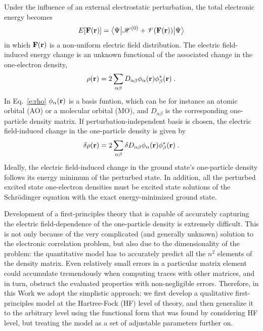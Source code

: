 \documentclass[aip,graphicx]{revtex4-1}
\newcommand{\tbraket}[3]{\ensuremath{\bigl\langle {#1} \bigl\lvert {#2} \bigl\lvert {#3} \bigr\rangle}}
\begin{document}
Under the influence of an external electrostatic perturbation, the total electronic energy
becomes
%
\begin{equation}
 E[{\bf F}({\bf r})] = \tbraket{\Psi}{\mathscr{H}^{(0)} + \mathscr{V}({\bf F}({\bf r}))}{\Psi}
\end{equation}
%
in which ${\bf F}({\bf r})$ is a non\hyp{}uniform electric field distribution.
The electric field\hyp{}induced energy change is an unknown functional 
of the associated change in the one\hyp{}electron density,
%
\begin{equation}\label{e:rho}
 \rho({\bf r}) = 2\sum_{\alpha\beta} D_{\alpha\beta} \phi_\alpha({\bf r}) \phi^*_\beta({\bf r}) \;.
\end{equation}
%
In Eq.~\eqref{e:rho} $\phi_\alpha({\bf r})$ is a basis funtion, which can be for instance 
an atomic orbital (AO) or a molecular orbital (MO), and $D_{\alpha\beta}$ is the corresponding
one\hyp{}particle density matrix.
If perturbation\hyp{}independent basis is chosen, the electric field\hyp{}induced change in the one\hyp{}particle density
is given by
%
\begin{equation}\label{e:rho}
 \delta \rho({\bf r}) = 2\sum_{\alpha\beta} \delta D_{\alpha\beta} \phi_\alpha({\bf r}) \phi^*_\beta({\bf r}) \;.
\end{equation}
%
Ideally, the electric field\hyp{}induced change in the ground state's one\hyp{}particle density 
follows its energy minimum of the perturbed state. In addition, all the perturbed 
excited state one\hyp{}electron densities must be excited state solutions of the Schr{\"o}dinger equation
with the exact energy\hyp{}minimized ground state. 

Development of a first\hyp{}principles theory
that is capable of accurately capturing the electric field\hyp{}dependence of the one\hyp{}particle density
is extremely difficult. This is not only because of the very complicated (and generally unknown) solution
to the electronic correlation problem, but also due to the dimensionality of the problem: the quantitative
model has to accurately predict all the $n^2$ elements of the density matrix. Even relatively small errors
in a particular matrix element could accumulate tremendously when computing traces with other matrices,
and in turn, obstruct the evaluated properties with non\hyp{}negligible errors.
Therefore, in this Work we adopt the simplistic approach: we first develop a qualitative first\hyp{}principles model 
at the Hartree\hyp{}Fock (HF)
level of theory, and then generalize it to the arbitrary level using the functional form that was found 
by considering HF level,
but treating the model as a set of adjustable parameters further on.
\end{document}
